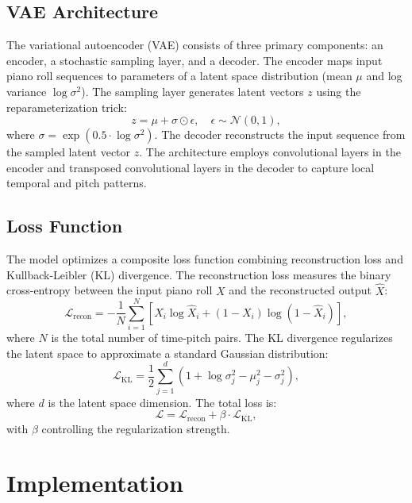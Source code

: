 \documentclass[conference]{IEEEtran}
\begin{document}
\subsection{VAE Architecture}
The variational autoencoder (VAE) consists of three primary components: an encoder, a stochastic sampling layer, and a decoder. The encoder maps input piano roll sequences to parameters of a latent space distribution (mean $\mu$ and log variance $\log\sigma^2$). The sampling layer generates latent vectors $z$ using the reparameterization trick:
\begin{equation}
    z = \mu + \sigma \odot \epsilon, \quad \epsilon \sim \mathcal{N}(0, 1),
\end{equation}
where $\sigma = \exp(0.5 \cdot \log\sigma^2)$. The decoder reconstructs the input sequence from the sampled latent vector $z$. The architecture employs convolutional layers in the encoder and transposed convolutional layers in the decoder to capture local temporal and pitch patterns.

\subsection{Loss Function}
The model optimizes a composite loss function combining reconstruction loss and Kullback-Leibler (KL) divergence. The reconstruction loss measures the binary cross-entropy between the input piano roll $X$ and the reconstructed output $\hat{X}$:
\begin{equation}
    \mathcal{L}_{\text{recon}} = -\frac{1}{N} \sum_{i=1}^N \left[ X_i \log \hat{X}_i + (1 - X_i) \log (1 - \hat{X}_i) \right],
\end{equation}
where $N$ is the total number of time-pitch pairs. The KL divergence regularizes the latent space to approximate a standard Gaussian distribution:
\begin{equation}
    \mathcal{L}_{\text{KL}} = \frac{1}{2} \sum_{j=1}^d \left( 1 + \log\sigma_j^2 - \mu_j^2 - \sigma_j^2 \right),
\end{equation}
where $d$ is the latent space dimension. The total loss is:
\begin{equation}
    \mathcal{L} = \mathcal{L}_{\text{recon}} + \beta \cdot \mathcal{L}_{\text{KL}},
\end{equation}
with $\beta$ controlling the regularization strength.

\section{Implementation}
\label{sec:implementation}
\end{document}
